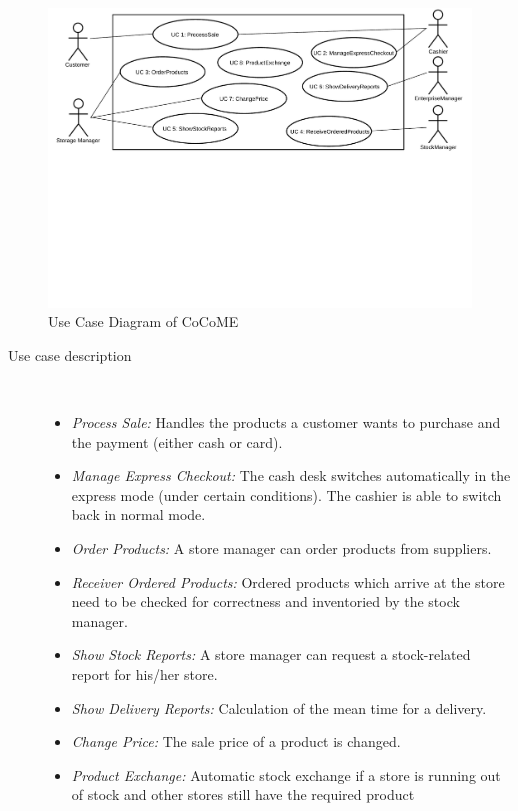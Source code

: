 \begin{figure}[h!]
	\includegraphics[width=\textwidth, trim={0 11cm 0 0}]{img/useCase.pdf}
	\caption{Use Case Diagram of CoCoME}
	\label{fig:useCases}
\end{figure}


\begin{description}


 \item[Use case description]~\par
\begin{itemize}
	\item \textit{Process Sale:} Handles the products a customer wants to purchase and the payment (either cash or card).

    \item \textit{Manage Express Checkout:} The cash desk switches automatically in the express mode (under certain conditions). The cashier is able to switch back in normal mode.
    \item \textit{Order Products:} A store manager can order products from suppliers.
    \item \textit{Receiver Ordered Products:} Ordered products which arrive at the store need to be checked for correctness and inventoried by the stock manager.
    \item \textit{Show Stock Reports:} A store manager can request a stock-related report for his/her store.
    \item \textit{Show Delivery Reports:} Calculation of the mean time for a delivery.
    \item \textit{Change Price:} The sale price of a product is changed.
    \item \textit{Product Exchange:} Automatic stock exchange if a store is running out of stock and other stores still have the required product
\end{itemize}


\end{description}